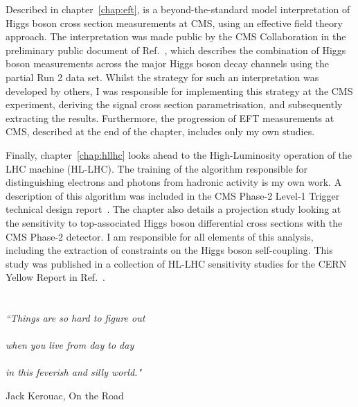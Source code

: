Described in chapter~\ref{chap:eft}, is a beyond-the-standard model interpretation of Higgs boson cross section measurements at CMS, using an effective field theory approach. The interpretation was made public by the CMS Collaboration in the preliminary public document of Ref.~\cite{CMS-PAS-HIG-19-005}, which describes the combination of Higgs boson measurements across the major Higgs boson decay channels using the partial Run 2 data set. Whilst the strategy for such an interpretation was developed by others, I was responsible for implementing this strategy at the CMS experiment, deriving the signal cross section parametrisation, and subsequently extracting  the results. Furthermore, the progression of EFT measurements at CMS, described at the end of the chapter, includes only my own studies.

Finally, chapter~\ref{chap:hllhc} looks ahead to the High-Luminosity operation of the LHC machine (HL-LHC). The training of the algorithm responsible for distinguishing electrons and photons from hadronic activity is my own work. A description of this algorithm was included in the CMS Phase-2 Level-1 Trigger technical design report~\cite{CERN-LHCC-2020-004}. The chapter also details a projection study looking at the sensitivity to top-associated Higgs boson differential cross sections with the CMS Phase-2 detector. I am responsible for all elements of this analysis, including the extraction of constraints on the Higgs boson self-coupling. This study was published in a collection of HL-LHC sensitivity studies for the CERN Yellow Report in Ref.~\cite{Cepeda:2019klc}.

\chapter*{}
\epigraph{
  \textit{``Things are so hard to figure out \\ \\
            when you live from day to day \\ \\
            in this feverish and silly world."}}
          {Jack Kerouac, On the Road}
\cleardoublepage

